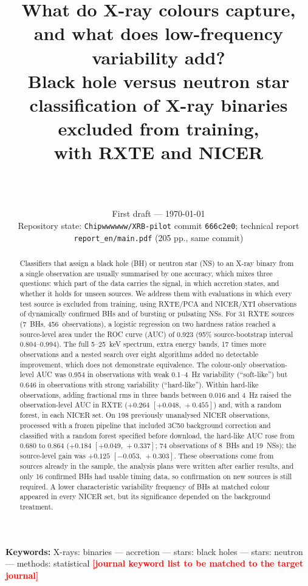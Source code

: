 \documentclass[11pt,a4paper]{article}
\title{What do X-ray colours capture, and what does low-frequency variability add?\\[2pt]
\large Black hole versus neutron star classification of X-ray binaries excluded from training,\\ with RXTE and NICER}
\author{\placeholder{Author names and order to be decided}\\[2pt]
\small\placeholder{Affiliations to be added}\\
\small\placeholder{Corresponding author e-mail}}
\date{First draft --- \today\\
\small Repository state: \texttt{Chipwwwwww/XRB-pilot} commit \texttt{666c2e0}; technical report \texttt{report\_en/main.pdf} (205 pp., same commit)}
\newcommand{\placeholder}[1]{\textcolor{red}{\textbf{[#1]}}}
\newcommand{\ci}[2]{$[#1,\,#2]$}
\begin{document}
\maketitle

\begin{abstract}
\noindent
Classifiers that assign a black hole (BH) or neutron star (NS) to an X-ray binary from a single observation are usually
summarised by one accuracy, which mixes three questions: which part of the data carries the signal, in which accretion
states, and whether it holds for unseen sources. We address them with evaluations in which every test source is excluded
from training, using RXTE/PCA and NICER/XTI observations of dynamically confirmed BHs and of bursting or pulsating NSs.
For 31 RXTE sources (7~BHs, 456~observations), a logistic regression on two hardness ratios reached a source-level area
under the ROC curve (AUC) of 0.923 (95\% source-bootstrap interval 0.804--0.994). The full 5--25~keV spectrum, extra
energy bands, 17 times more observations and a nested search over eight algorithms added no detectable improvement,
which does not demonstrate equivalence. The colour-only observation-level AUC was 0.954 in observations with weak
0.1--4~Hz variability (``soft-like'') but 0.646 in observations with strong variability (``hard-like''). Within hard-like
observations, adding fractional rms in three bands between 0.016 and 4~Hz raised the observation-level AUC in RXTE
($+0.264$ \ci{+0.048}{+0.455}) and, with a random forest, in each NICER set. On 198 previously unanalysed NICER
observations, processed with a frozen pipeline that included 3C50 background correction and classified with a random
forest specified before download, the hard-like AUC rose from 0.680 to 0.864 ($+0.184$ \ci{+0.049}{+0.337}; 74
observations of 8~BHs and 19~NSs); the source-level gain was $+0.125$ \ci{-0.053}{+0.303}. These observations come from
sources already in the sample, the analysis plans were written after earlier results, and only 16 confirmed BHs had
usable timing data, so confirmation on new sources is still required. A lower characteristic variability frequency of
BHs at matched colour appeared in every NICER set, but its significance depended on the background treatment.
\end{abstract}

\noindent\textbf{Keywords:} X-rays: binaries --- accretion --- stars: black holes --- stars: neutron --- methods: statistical
\placeholder{journal keyword list to be matched to the target journal}
\end{document}
